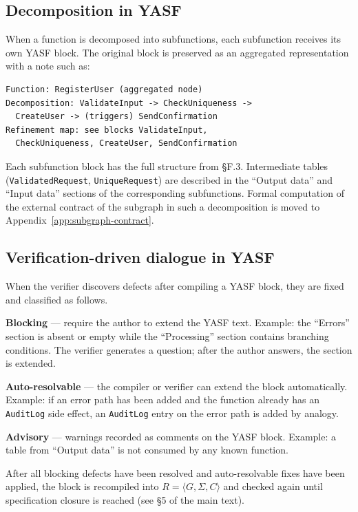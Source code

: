 \subsection{Decomposition in YASF}

When a function is decomposed into subfunctions, each subfunction receives its own YASF block. The original block is preserved as an aggregated representation with a note such as:

\begin{lstlisting}
Function: RegisterUser (aggregated node)
Decomposition: ValidateInput -> CheckUniqueness ->
  CreateUser -> (triggers) SendConfirmation
Refinement map: see blocks ValidateInput,
  CheckUniqueness, CreateUser, SendConfirmation
\end{lstlisting}

Each subfunction block has the full structure from \S F.3. Intermediate tables (\texttt{ValidatedRequest}, \texttt{UniqueRequest}) are described in the ``Output data'' and ``Input data'' sections of the corresponding subfunctions. Formal computation of the external contract of the subgraph in such a decomposition is moved to Appendix~\ref{app:subgraph-contract}.

\subsection{Verification-driven dialogue in YASF}

When the verifier discovers defects after compiling a YASF block, they are fixed and classified as follows.

\textbf{Blocking} --- require the author to extend the YASF text. Example: the ``Errors'' section is absent or empty while the ``Processing'' section contains branching conditions. The verifier generates a question; after the author answers, the section is extended.

\textbf{Auto-resolvable} --- the compiler or verifier can extend the block automatically. Example: if an error path has been added and the function already has an \texttt{AuditLog} side effect, an \texttt{AuditLog} entry on the error path is added by analogy.

\textbf{Advisory} --- warnings recorded as comments on the YASF block. Example: a table from ``Output data'' is not consumed by any known function.

After all blocking defects have been resolved and auto-resolvable fixes have been applied, the block is recompiled into $R = \langle G, \Sigma, C \rangle$ and checked again until specification closure is reached (see \S 5 of the main text).

